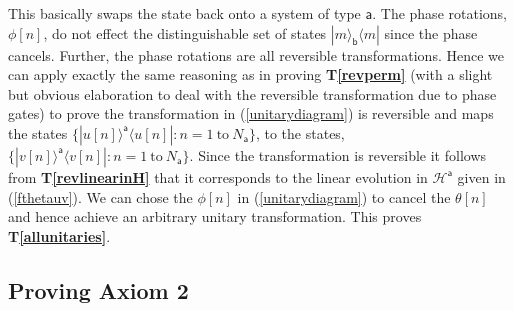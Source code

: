 \documentclass[10pt]{article}
\begin{document}
This basically swaps the state back onto a system of type $\mathsf{a}$.   The phase rotations, $\phi[n]$, do not effect the distinguishable set of states $|m\rangle_\mathsf{b}\langle m|$ since the phase cancels.  Further, the phase rotations are all reversible transformations.  Hence we can apply exactly the same reasoning as in proving {\bf T\ref{revperm}} (with a slight but obvious elaboration to deal with the reversible transformation due to phase gates) to prove the transformation in (\ref{unitarydiagram}) is reversible and maps the states $\{|u[n]\rangle^\mathsf{a}\langle u[n]|: n=1~\text{to}~N_\mathsf{a}\}$, to the states, $\{|v[n]\rangle^\mathsf{a}\langle v[n]|: n=1~\text{to}~N_\mathsf{a}\}$.  Since the transformation is reversible it follows from {\bf T\ref{revlinearinH}} that it corresponds to the linear evolution in $\mathcal{H}^\mathsf{a}$ given in (\ref{fthetauv}).  We can chose the $\phi[n]$ in (\ref{unitarydiagram}) to cancel the $\theta[n]$ and hence achieve an arbitrary unitary transformation.  This proves {\bf T\ref{allunitaries}}.


\subsection{Proving Axiom 2}
\end{document}

